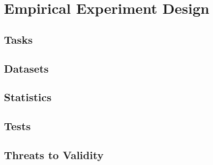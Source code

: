 \chapter{Empirical Experiment Design}
\ifpdf
    \graphicspath{{Chapter7/Chapter7Figs/PNG/}{Chapter7/Chapter7Figs/PDF/}{Chapter7/Chapter7Figs/}}
\else
    \graphicspath{{Chapter7/Chapter7Figs/EPS/}{Chapter7/Chapter7Figs/}}
\fi

\section{Tasks}

\section{Datasets}

\section{Statistics}

\section{Tests}

\section{Threats to Validity}


